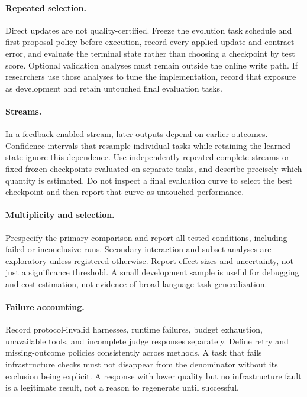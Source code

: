 \paragraph{Repeated selection.}
Direct updates are not quality-certified. Freeze the evolution task schedule and first-proposal policy before execution, record every applied update and contract error, and evaluate the terminal state rather than choosing a checkpoint by test score. Optional validation analyses must remain outside the online write path. If researchers use those analyses to tune the implementation, record that exposure as development and retain untouched final evaluation tasks.

\paragraph{Streams.}
In a feedback-enabled stream, later outputs depend on earlier outcomes. Confidence intervals that resample individual tasks while retaining the learned state ignore this dependence. Use independently repeated complete streams or fixed frozen checkpoints evaluated on separate tasks, and describe precisely which quantity is estimated. Do not inspect a final evaluation curve to select the best checkpoint and then report that curve as untouched performance.

\paragraph{Multiplicity and selection.}
Prespecify the primary comparison and report all tested conditions, including failed or inconclusive runs. Secondary interaction and subset analyses are exploratory unless registered otherwise. Report effect sizes and uncertainty, not just a significance threshold. A small development sample is useful for debugging and cost estimation, not evidence of broad language-task generalization.

\paragraph{Failure accounting.}
Record protocol-invalid harnesses, runtime failures, budget exhaustion, unavailable tools, and incomplete judge responses separately. Define retry and missing-outcome policies consistently across methods. A task that fails infrastructure checks must not disappear from the denominator without its exclusion being explicit. A response with lower quality but no infrastructure fault is a legitimate result, not a reason to regenerate until successful.

